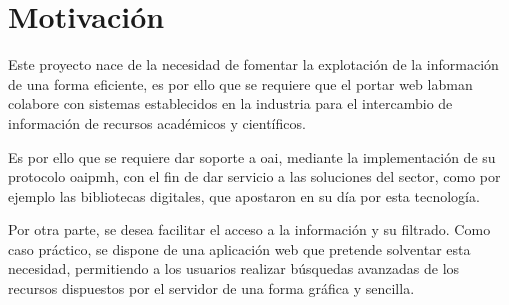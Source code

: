 \section{Motivación}

Este proyecto nace de la necesidad de fomentar la explotación de la información de una forma eficiente, es por ello que se requiere que el portar web \acrshort{labman} colabore con sistemas establecidos en la industria para el intercambio de información de recursos académicos y científicos.

Es por ello que se requiere dar soporte a \acrshort{oai}, mediante la implementación de su protocolo \acrshort{oaipmh}, con el fin de dar servicio a las soluciones del sector, como por ejemplo las bibliotecas digitales, que apostaron en su día por esta tecnología.

Por otra parte, se desea facilitar el acceso a la información y su filtrado. Como caso práctico, se dispone de una aplicación web que pretende solventar esta necesidad, permitiendo a los usuarios realizar búsquedas avanzadas de los recursos dispuestos por el servidor de una forma gráfica y sencilla.






